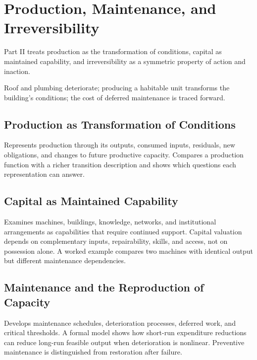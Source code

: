 \part{Production, Maintenance, and Irreversibility}
\label{part:II}

Part II treats production as the transformation of conditions, capital as maintained capability, and irreversibility as a symmetric property of action and inaction.

\begin{housing}Roof and plumbing deteriorate; producing a habitable unit transforms the building's conditions; the cost of deferred maintenance is traced forward.\end{housing}

\chapter{Production as Transformation of Conditions}\label{ch:6}
Represents production through its outputs, consumed inputs, residuals, new obligations, and changes to future productive capacity. Compares a production function with a richer transition description and shows which questions each representation can answer.
\scaffold

\chapter{Capital as Maintained Capability}\label{ch:7}
Examines machines, buildings, knowledge, networks, and institutional arrangements as capabilities that require continued support. Capital valuation depends on complementary inputs, repairability, skills, and access, not on possession alone. A worked example compares two machines with identical output but different maintenance dependencies.
\scaffold

\chapter{Maintenance and the Reproduction of Capacity}\label{ch:8}
Develops maintenance schedules, deterioration processes, deferred work, and critical thresholds. A formal model shows how short-run expenditure reductions can reduce long-run feasible output when deterioration is nonlinear. Preventive maintenance is distinguished from restoration after failure.
\scaffold

